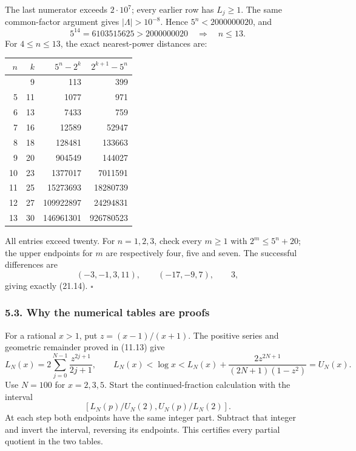 \documentclass[
  11pt,
  a4paper,
]{article}
\newcounter{none} %
\begin{document}
The last numerator exceeds \(2\cdot10^7\); every earlier row has
\(L_j\ge1\). The same common-factor argument gives
\(|\Lambda|>10^{-8}\). Hence \(5^n<2000000020\), and \[
 5^{14}=6103515625>2000000020
 \quad\Longrightarrow\quad n\le13.
 \tag{21.18}
\] For \(4\le n\le13\), the exact nearest-power distances are:

{\def\LTcaptype{none} %
\begin{longtable}[]{@{}rrrr@{}}
\toprule\noalign{}
\(n\) & \(k\) & \(5^n-2^k\) & \(2^{k+1}-5^n\) \\
\midrule\noalign{}
\endhead
\bottomrule\noalign{}
\endlastfoot
4 & 9 & 113 & 399 \\
5 & 11 & 1077 & 971 \\
6 & 13 & 7433 & 759 \\
7 & 16 & 12589 & 52947 \\
8 & 18 & 128481 & 133663 \\
9 & 20 & 904549 & 144027 \\
10 & 23 & 1377017 & 7011591 \\
11 & 25 & 15273693 & 18280739 \\
12 & 27 & 109922897 & 24294831 \\
13 & 30 & 146961301 & 926780523 \\
\end{longtable}
}

All entries exceed twenty. For \(n=1,2,3\), check every \(m\ge1\) with
\(2^m\le5^n+20\); the upper endpoints for \(m\) are respectively four,
five and seven. The successful differences are \[
 (-3,-1,3,11),\qquad(-17,-9,7),\qquad3,
\] giving exactly (21.14). \(\square\)

\subsubsection{5.3. Why the numerical tables are
proofs}\label{why-the-numerical-tables-are-proofs}

For a rational \(x>1\), put \(z=(x-1)/(x+1)\). The positive series and
geometric remainder proved in (11.13) give \[
 L_N(x)=2\sum_{j=0}^{N-1}\frac{z^{2j+1}}{2j+1},
 \qquad
 L_N(x)<\log x<
 L_N(x)+\frac{2z^{2N+1}}{(2N+1)(1-z^2)}=U_N(x).
 \tag{21.19}
\] Use \(N=100\) for \(x=2,3,5\). Start the continued-fraction
calculation with the interval \[
 [L_N(p)/U_N(2),U_N(p)/L_N(2)].
\] At each step both endpoints have the same integer part. Subtract that
integer and invert the interval, reversing its endpoints. This certifies
every partial quotient in the two tables.
\end{document}
